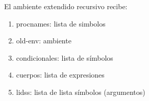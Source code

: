 {
El ambiente extendido recursivo recibe:
\begin{enumerate}

\item procnames: lista de simbolos %
\item old-env: ambiente %
\item condicionales: lista de símbolos
\item cuerpos: lista de expresiones %
\item lidss: lista de lista símbolos (argumentos) %

\end{enumerate}

}
